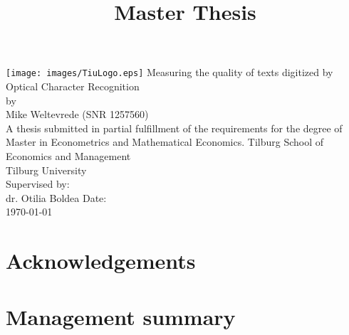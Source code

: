 \documentclass{article}
\title{Master Thesis}
\newcommand\blankpage{
    \null
    \thispagestyle{empty}
    \addtocounter{page}{-1}
    \newpage}
\begin{document}
\afterpage{\blankpage}

\begin{titlepage}
    \centering
 
    \vfill
    
    \texttt{[image: images/TiuLogo.eps]}
    \vskip2cm
    {\huge
        Measuring the quality of texts digitized by Optical Character Recognition\\
        \large\bigskip
        by\\
        Mike Weltevrede (SNR 1257560)\\
        \vskip2cm
        A thesis submitted in partial fulfillment of the requirements for the degree of Master in Econometrics and Mathematical Economics.
        \vskip0.5cm
        Tilburg School of Economics and Management\\
        Tilburg University\\
        \vskip2cm
        Supervised by:\\
        dr. Otilia Boldea
		\vfill
        Date:\\
        \today
    }   
    \vfill
    \vfill
\end{titlepage}

\newpage

\tableofcontents

\newpage

\section{Acknowledgements}\label{sec:acknowledgements}

\section{Management summary}\label{sec:management_summary}
\end{document}
